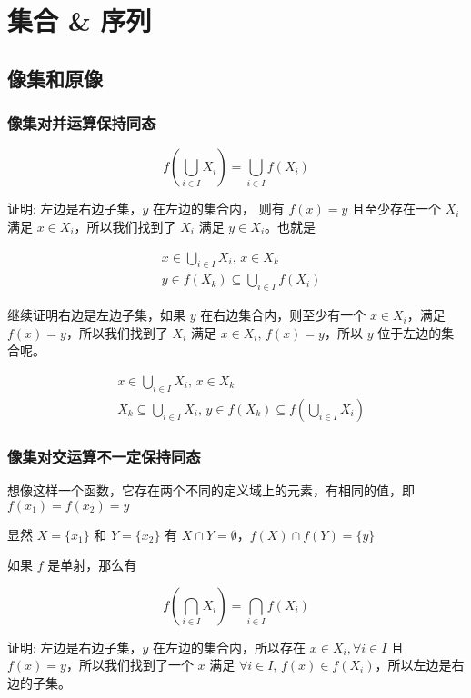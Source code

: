 \chapter{集合 \& 序列}

\section{像集和原像}

\subsection{像集对并运算保持同态}

\[
f(\bigcup_{i \in I} X_i) = \bigcup_{i \in I} f(X_i)
\]


证明: 左边是右边子集，$y$ 在左边的集合内， 则有 $f(x) = y$ 且至少存在一个 $X_i$ 满足 $x \in X_i$，所以我们找到了 $X_i$ 满足 $y \in X_i$。也就是

\begin{align*}
    & x \in \bigcup_{i \in I}X_i,\, x \in X_k \\
    & y \in f(X_k) \subseteq \bigcup_{i \in I}f(X_i)
\end{align*}

继续证明右边是左边子集，如果 $y$ 在右边集合内，则至少有一个 $x \in X_i$，满足 $f(x) = y$，所以我们找到了 $X_i$ 满足 $x \in X_i,\, f(x) = y$，所以 
$y$ 位于左边的集合呢。

\begin{align*}
    & x \in \bigcup_{i \in I}X_i,\, x \in X_k \\
    & X_k \subseteq \bigcup_{i \in I}X_i ,\, y \in f(X_k) \subseteq f(\bigcup_{i \in I}X_i)
\end{align*}

\subsection{像集对交运算不一定保持同态}

想像这样一个函数，它存在两个不同的定义域上的元素，有相同的值，即 $f(x_1) = f(x_2) = y$

显然 $X = \{ x_1 \}$ 和 $Y = \{ x_2 \}$ 有 $X \cap Y = \emptyset$，$f(X) \cap f(Y) = \{ y \} $

如果 $f$ 是单射，那么有 

\[
f(\bigcap_{i \in I}X_i) = \bigcap_{i \in I}f(X_i)
\]

证明: 左边是右边子集，$y$ 在左边的集合内，所以存在 $x \in X_i, \forall i \in I$ 且 $f(x) = y$，所以我们找到了一个 $x$ 满足 $\forall i \in I,\, f(x) \in f(X_i)$，所以左边是右边的子集。


